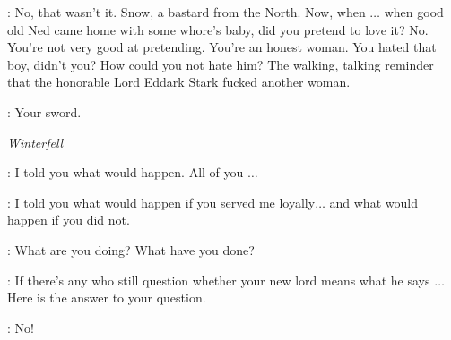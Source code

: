 
\JAIME: No, that wasn't it. Snow, a bastard from the North. Now, when $\ldots$ when good old Ned came home with some whore's baby, did you pretend to love it? No. You're not very good at pretending. You're an honest woman. You hated that boy, didn't you? How could you not hate him? The walking, talking reminder that the honorable Lord Eddark Stark fucked another woman.

\CATELYN:  Your sword.



\scene

\textit{Winterfell}


\THEON: I told you what would happen. All of you $\ldots$


\THEON: I told you what would happen if you served me loyally$\ldots$ and what would happen if you did not.

\LUWIN: What are you doing? What have you done?

\THEON: If there's any who still question whether your new lord means what he says $\ldots$ Here is the answer to your question.


\LUWIN: No!


